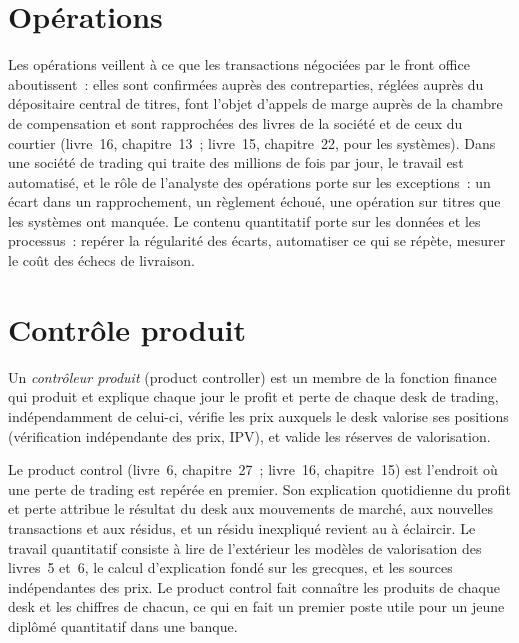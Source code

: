 \section{Opérations}

Les opérations veillent à ce que les transactions négociées par le front office aboutissent~: elles sont confirmées auprès des contreparties, réglées auprès du
dépositaire central de titres, font l'objet d'appels de marge auprès de la chambre de compensation et sont rapprochées des livres de la société et de ceux du courtier
(livre~16, chapitre~13~; livre~15, chapitre~22, pour les systèmes). Dans une société de trading qui traite des millions de fois par jour, le
travail est automatisé, et le rôle de l'analyste des opérations porte sur les exceptions~: un écart dans un rapprochement, un
règlement échoué, une opération sur titres que les systèmes ont manquée. Le contenu quantitatif porte sur les données et les processus~: repérer
la régularité des écarts, automatiser ce qui se répète, mesurer le coût des échecs de livraison.

\section{Contrôle produit}

\begin{definition}\label{def:in:risk-operations-product-control-and-compliance:controller}
Un \emph{contrôleur produit} (product controller) est un membre de la fonction finance qui produit et explique
chaque jour le profit et perte de chaque desk de trading, indépendamment de celui-ci, vérifie les prix auxquels le desk
valorise ses positions (vérification indépendante des prix, IPV), et valide les réserves de valorisation.
\end{definition}

Le product control (livre~6, chapitre~27~; livre~16, chapitre~15) est l'endroit où une perte de trading est repérée en premier. Son explication quotidienne du profit et
perte attribue le résultat du desk aux mouvements de marché, aux nouvelles transactions et aux résidus, et un résidu inexpliqué revient au
 à éclaircir. Le travail quantitatif consiste à lire de l'extérieur les modèles de valorisation des livres~5 et~6, le
calcul d'explication fondé sur les grecques, et les sources indépendantes des prix. Le product control fait connaître les produits de chaque
desk et les chiffres de chacun, ce qui en fait un premier poste utile pour un jeune diplômé quantitatif dans une banque.

